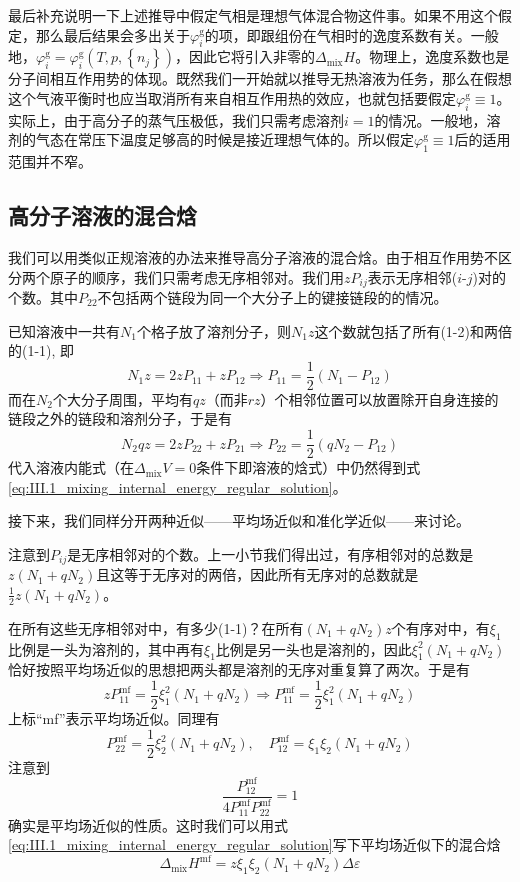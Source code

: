 \documentclass[main.tex]{subfiles}
\begin{document}
最后补充说明一下上述推导中假定气相是理想气体混合物这件事。如果不用这个假定，那么最后结果会多出关于$\varphi_i^\text{g}$的项，即跟组份在气相时的逸度系数有关。一般地，$\varphi_i^\text{g}=\varphi_i^\text{g}\left(T,p,\left\{n_j\right\}\right)$，因此它将引入非零的$\Delta_\text{mix}H$。物理上，逸度系数也是分子间相互作用势的体现。既然我们一开始就以推导无热溶液为任务，那么在假想这个气液平衡时也应当取消所有来自相互作用热的效应，也就包括要假定$\varphi_i^\text{g}\equiv 1$。实际上，由于高分子的蒸气压极低，我们只需考虑溶剂$i=1$的情况。一般地，溶剂的气态在常压下温度足够高的时候是接近理想气体的。所以假定$\varphi_1^\text{g}\equiv 1$后的适用范围并不窄。

\subsection{高分子溶液的混合焓}
我们可以用类似正规溶液的办法来推导高分子溶液的混合焓。由于相互作用势不区分两个原子的顺序，我们只需考虑无序相邻对。我们用$zP_{ij}$表示无序相邻($i$-$j$)对的个数。其中$P_{22}$不包括两个链段为同一个大分子上的键接链段的的情况。

已知溶液中一共有$N_1$个格子放了溶剂分子，则$N_1z$这个数就包括了所有(1-2)和两倍的(1-1), 即
\[N_1z=2zP_{11}+zP_{12}\Rightarrow P_{11}=\frac{1}{2}\left(N_1-P_{12}\right)\]
而在$N_2$个大分子周围，平均有$qz$（而非$rz$）个相邻位置可以放置除开自身连接的链段之外的链段和溶剂分子，于是有
\[N_2qz=2zP_{22}+zP_{21}\Rightarrow P_{22}=\frac{1}{2}\left(qN_2-P_{12}\right)\]
代入溶液内能式（在$\Delta_\text{mix}V=0$条件下即溶液的焓式）中仍然得到式\eqref{eq:III.1_mixing_internal_energy_regular_solution}。

接下来，我们同样分开两种近似——平均场近似和准化学近似——来讨论。

注意到$P_{ij}$是无序相邻对的个数。上一小节我们得出过，有序相邻对的总数是$z\left(N_1+qN_2\right)$且这等于无序对的两倍，因此所有无序对的总数就是$\frac{1}{2}z\left(N_1+qN_2\right)$。

在所有这些无序相邻对中，有多少(1-1)？在所有$\left(N_1+qN_2\right)z$个有序对中，有$\xi_1$比例是一头为溶剂的，其中再有$\xi_1$比例是另一头也是溶剂的，因此$\xi_1^2\left(N_1+qN_2\right)$恰好按照平均场近似的思想把两头都是溶剂的无序对重复算了两次。于是有
\[zP_{11}^\text{mf}=\frac{1}{2}\xi_1^2\left(N_1+qN_2\right)\Rightarrow P_{11}^\text{mf}=\frac{1}{2}\xi_1^2\left(N_1+qN_2\right)\]
上标“mf”表示平均场近似。同理有
\[P_{22}^\text{mf}=\frac{1}{2}\xi_2^2\left(N_1+qN_2\right),\quad P_{12}^\text{mf}=\xi_1\xi_2\left(N_1+qN_2\right)\]
注意到
\[\frac{P_{12}^\text{mf}}{4P_{11}^\text{mf}P_{22}^\text{mf}}=1\]
确实是平均场近似的性质。这时我们可以用式\eqref{eq:III.1_mixing_internal_energy_regular_solution}写下平均场近似下的混合焓
\begin{equation}\label{eq:III.3_polymer_solution_mixing_enthalpy_mf}\Delta_\text{mix}H^\text{mf}=z\xi_1\xi_2\left(N_1+qN_2\right)\Delta\varepsilon\end{equation}
\end{document}

